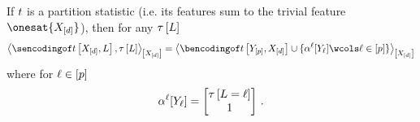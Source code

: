 \documentclass[aps,onecolumn,nofootinbib,pra]{article}
\begin{document}
    \begin{lemma}
        \label{lem:parStatSencToBenc}
        If $t$ is a partition statistic (i.e. its features sum to the trivial feature $\onesat{\shortcatvariables}$), then for any $\tau\left[L\right]$
        \begin{align*}
            \contractionof{\sencsstatwith,\hypercoreat{\selvariable}}{\shortcatvariables}
            = \contractionof{\bencsstatwith \cup \{\actcoreofat{\selindex}{\headvariableof{\selindex}} \wcols \selindexin\}}{\shortcatvariables}
        \end{align*}
        where for $\ell\in[p]$
        \begin{align*}
            \alpha^{\ell}[Y_{\ell}]
            = \begin{bmatrix}
                  \tau\left[L=\ell\right] \\
                  1
            \end{bmatrix} \, .
        \end{align*}
    \end{lemma}
\end{document}
